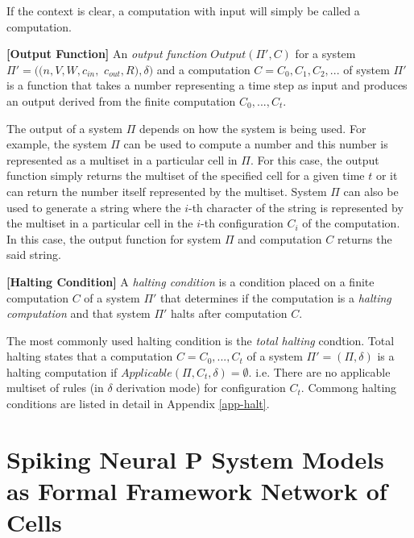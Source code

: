 \documentclass[a4paper]{article}
\theoremstyle{definition}
\begin{document}
If the context is clear, a computation with input will simply be called a computation.


\label{def-output} \textbf{[Output Function]} An \emph{output function} 
$Output(\Pi',C)$ for a system $\Pi' = ((n,V,W,c_{in},$ $c_{out},R),\delta)$ and a computation 
$C=C_0,C_1,C_2,...$ of system $\Pi'$ is a function that takes a number representing a time step
as input and produces an output derived from the finite computation $C_0,...,C_t$.

The output of a system $\Pi$ depends on how the system is being used. For example, the system $\Pi$
can be used to compute a number and this number is represented as a multiset in a particular cell in
$\Pi$. For this case, the output function simply returns the multiset of the specified cell for a 
given time $t$ or it can return the number itself represented by the multiset. System $\Pi$ can also 
be used to generate a string where the $i$-th character of the string is represented by the multiset 
in a particular cell in the $i$-th configuration $C_i$ of the computation. In this case, the output 
function for system $\Pi$ and computation $C$ returns the said string.


\label{def-halt}\textbf{[Halting Condition]} A \emph{halting condition} is a condition
placed on a finite computation $C$ of a system $\Pi'$ that determines if the computation is a 
\emph{halting computation} and that system $\Pi'$ halts after computation $C$.

The most commonly used halting condition is the \emph{total halting} condtion. Total halting states
that a computation $C = C_0,...,C_t$ of a system $\Pi'=(\Pi,\delta)$ is a halting computation if 
$Applicable(\Pi,C_t,\delta) = \emptyset$. i.e. There are no applicable multiset of rules (in 
$\delta$ derivation mode) for configuration $C_t$. Commong halting conditions are listed in detail
in Appendix \ref{app-halt}.


\section{Spiking Neural P System Models as Formal Framework Network of Cells}\label{sec-snp}
\end{document}
